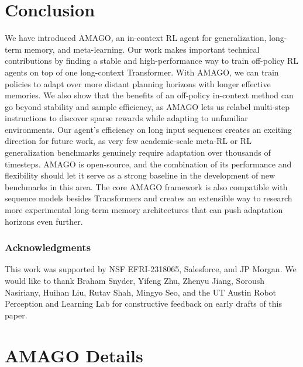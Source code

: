 \documentclass{article}
\begin{document}
\section{Conclusion}
We have introduced AMAGO, an in-context RL agent for generalization, long-term memory, and meta-learning. Our work makes important technical contributions by finding a stable and high-performance way to train off-policy RL agents on top of one long-context Transformer. With AMAGO, we can train policies to adapt over more distant planning horizons with longer effective memories. We also show that the benefits of an off-policy in-context method can go beyond stability and sample efficiency, as AMAGO lets us relabel multi-step instructions to discover sparse rewards while adapting to unfamiliar environments. Our agent's efficiency on long input sequences creates an exciting direction for future work, as very few academic-scale meta-RL or RL generalization benchmarks genuinely require adaptation over thousands of timesteps. AMAGO is open-source, and the combination of its performance and flexibility should let it serve as a strong baseline in the development of new benchmarks in this area. The core AMAGO framework is also compatible with sequence models besides Transformers and creates an extensible way to research more experimental long-term memory architectures that can push adaptation horizons even further.
\subsubsection*{Acknowledgments}
This work was supported by NSF EFRI-2318065, Salesforce, and JP Morgan. We would like to thank Braham Snyder, Yifeng Zhu, Zhenyu Jiang, Soroush Nasiriany, Huihan Liu, Rutav Shah, Mingyo Seo, and the UT Austin Robot Perception and Learning Lab for constructive feedback on early drafts of this paper.
\printbibliography
\appendix
\newpage
\section{AMAGO Details}
\label{app:implementation_details}
\end{document}
